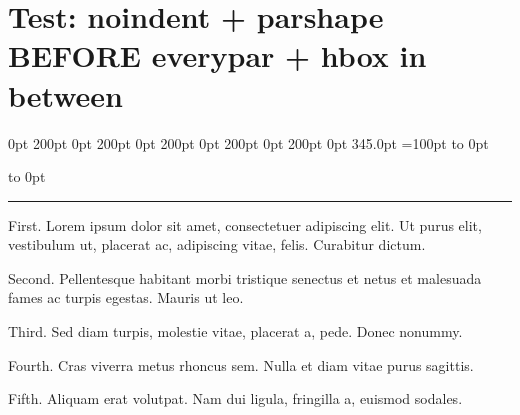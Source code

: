\documentclass[11pt,a4paper]{article}
\begin{document}
\section{Test: noindent + parshape BEFORE everypar + hbox in between}

\noindent
{} 0pt 200pt 0pt 200pt 0pt 200pt 0pt 200pt 0pt 200pt 0pt 345.0pt\relax
{}=100pt
\hbox to 0pt{\vbox to 0pt{\color{red}\rule{50pt}{50pt}\vss}\hss}%
%
First. Lorem ipsum dolor sit amet, consectetuer adipiscing elit. Ut purus elit, vestibulum ut, placerat ac, adipiscing vitae, felis. Curabitur dictum.

Second. Pellentesque habitant morbi tristique senectus et netus et malesuada fames ac turpis egestas. Mauris ut leo.

Third. Sed diam turpis, molestie vitae, placerat a, pede. Donec nonummy.

Fourth. Cras viverra metus rhoncus sem. Nulla et diam vitae purus sagittis.

Fifth. Aliquam erat volutpat. Nam dui ligula, fringilla a, euismod sodales.

\everypar{}%
\end{document}
